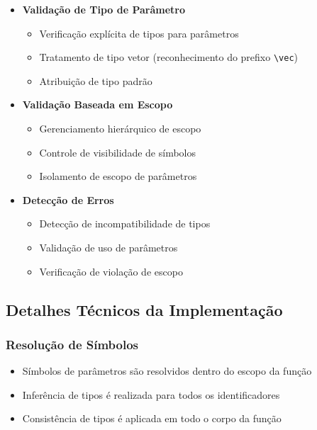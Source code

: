 \begin{itemize}
    \item \textbf{Validação de Tipo de Parâmetro}
    \begin{itemize}
        \item Verificação explícita de tipos para parâmetros
        \item Tratamento de tipo vetor (reconhecimento do prefixo \verb|\vec|)
        \item Atribuição de tipo padrão
    \end{itemize}

    \item \textbf{Validação Baseada em Escopo}
    \begin{itemize}
        \item Gerenciamento hierárquico de escopo
        \item Controle de visibilidade de símbolos
        \item Isolamento de escopo de parâmetros
    \end{itemize}

    \item \textbf{Detecção de Erros}
    \begin{itemize}
        \item Detecção de incompatibilidade de tipos
        \item Validação de uso de parâmetros
        \item Verificação de violação de escopo
    \end{itemize}
\end{itemize}

\subsection{Detalhes Técnicos da Implementação}

\subsubsection{Resolução de Símbolos}
\begin{itemize}
    \item Símbolos de parâmetros são resolvidos dentro do escopo da função
    \item Inferência de tipos é realizada para todos os identificadores
    \item Consistência de tipos é aplicada em todo o corpo da função
\end{itemize}

